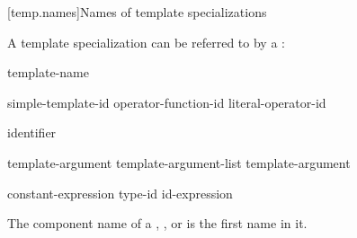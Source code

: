 [temp.names]{Names of template specializations}

\pnum
A template specialization can be referred to by a
:

\begin{bnf}
\br
  template-name \terminal{<}  \terminal{>}
\end{bnf}

\begin{bnf}
\br
  simple-template-id\br
  operator-function-id \terminal{<}  \terminal{>}\br
  literal-operator-id \terminal{<}  \terminal{>}
\end{bnf}

\begin{bnf}
\br
  identifier
\end{bnf}

\begin{bnf}
\br
  template-argument \br
  template-argument-list \terminal{,} template-argument 
\end{bnf}

\begin{bnf}
\br
  constant-expression\br
  type-id\br
  id-expression
\end{bnf}

\pnum
{}%
The component name of a
,
, or
is the first name in it.

